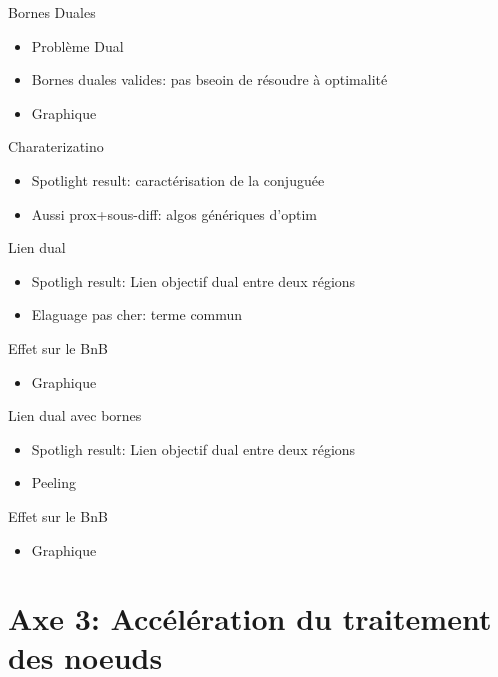 \documentclass[10pt]{beamer}
\begin{document}
\begin{frame}{Bornes Duales}
  \begin{itemize}
    \item Problème Dual
    \item Bornes duales valides: pas bseoin de résoudre à optimalité
    \item Graphique
  \end{itemize}
\end{frame}

\begin{frame}{Charaterizatino}
  \begin{itemize}
    \item Spotlight result: caractérisation de la conjuguée
    \item Aussi prox+sous-diff: algos génériques d'optim
  \end{itemize}
\end{frame}

\begin{frame}{Lien dual}
  \begin{itemize}
    \item Spotligh result: Lien objectif dual entre deux régions
    \item Elaguage pas cher: terme commun
  \end{itemize}
\end{frame}

\begin{frame}{Effet sur le BnB}
  \begin{itemize}
    \item Graphique
  \end{itemize}
\end{frame}

\begin{frame}{Lien dual avec bornes}
  \begin{itemize}
    \item Spotligh result: Lien objectif dual entre deux régions
    \item Peeling
  \end{itemize}
\end{frame}

\begin{frame}{Effet sur le BnB}
  \begin{itemize}
    \item Graphique
  \end{itemize}
\end{frame}

\section{Axe 3: Accélération du traitement des noeuds}
\end{document}
